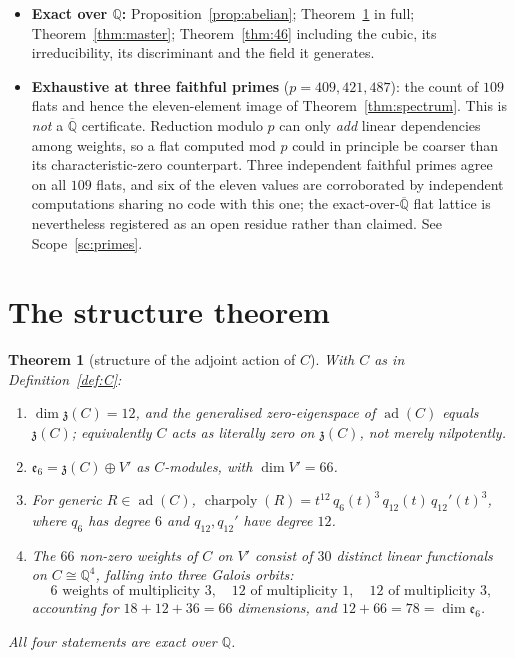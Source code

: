 \documentclass[11pt,a4paper]{article}
\newtheorem{theorem}{Theorem}[section]
\theoremstyle{definition}
\theoremstyle{remark}
\newcommand{\esix}{\mathfrak{e}_6}
\newcommand{\z}{\mathfrak{z}}
\newcommand{\Q}{\mathbb{Q}}
\newcommand{\ad}{\operatorname{ad}}
\newcommand{\charpoly}{\operatorname{charpoly}}
\begin{document}
\begin{itemize}[leftmargin=1.4em]
\item \textbf{Exact over $\Q$:} Proposition~\ref{prop:abelian}; Theorem~\ref{thm:structure} in
      full; Theorem~\ref{thm:master}; Theorem~\ref{thm:46} including the cubic, its
      irreducibility, its discriminant and the field it generates.
\item \textbf{Exhaustive at three faithful primes} ($p=409,421,487$): the count of $109$ flats
      and hence the eleven-element image of Theorem~\ref{thm:spectrum}. This is \emph{not} a
      $\overline{\Q}$ certificate. Reduction modulo $p$ can only \emph{add} linear dependencies
      among weights, so a flat computed mod $p$ could in principle be coarser than its
      characteristic-zero counterpart. Three independent faithful primes agree on all $109$
      flats, and six of the eleven values are corroborated by independent computations sharing
      no code with this one; the exact-over-$\overline{\Q}$ flat lattice is nevertheless
      registered as an open residue rather than claimed. See Scope~\ref{sc:primes}.
\end{itemize}

\section{The structure theorem}\label{sec:structure}

\begin{theorem}[structure of the adjoint action of $C$]\label{thm:structure}
With $C$ as in Definition~\ref{def:C}:
\begin{enumerate}[label=\textup{(\roman*)},leftmargin=2.4em]
\item $\dim\z(C)=12$, and the generalised zero-eigenspace of $\ad(C)$ \emph{equals} $\z(C)$;
      equivalently $C$ acts as literally zero on $\z(C)$, not merely nilpotently.
\item $\esix=\z(C)\oplus V'$ as $C$-modules, with $\dim V'=66$.
\item For generic $R\in\ad(C)$,
      $\charpoly(R)=t^{12}\,q_6(t)^{3}\,q_{12}(t)\,q_{12}'(t)^{3}$, where $q_6$ has degree $6$
      and $q_{12},q_{12}'$ have degree $12$.
\item The $66$ non-zero weights of $C$ on $V'$ consist of $30$ distinct linear functionals on
      $C\cong\Q^4$, falling into three Galois orbits:
      \[
        6\text{ weights of multiplicity }3,\quad
        12\text{ of multiplicity }1,\quad
        12\text{ of multiplicity }3,
      \]
      accounting for $18+12+36=66$ dimensions, and $12+66=78=\dim\esix$.
\end{enumerate}
All four statements are exact over $\Q$.
\end{theorem}
\end{document}
